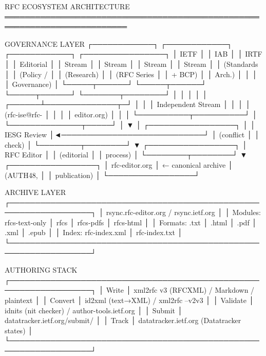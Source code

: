 \documentclass[11pt,letterpaper]{article}
\begin{document}
\begin{asciibox}
RFC ECOSYSTEM ARCHITECTURE
══════════════════════════════════════════════════════════════════════════

  GOVERNANCE LAYER
  ┌────────────┐   ┌────────────┐   ┌────────────┐   ┌────────────────┐
  │   IETF     │   │    IAB     │   │   IRTF     │   │   Editorial    │
  │  Stream    │   │  Stream    │   │  Stream    │   │    Stream      │
  │ (Standards │   │  (Policy / │   │ (Research) │   │  (RFC Series   │
  │  + BCP)    │   │  Arch.)    │   │            │   │   Governance)  │
  └─────┬──────┘   └─────┬──────┘   └─────┬──────┘   └───────┬────────┘
        │                │                │                   │
        │         ┌──────┴──────────────┬─┘                   │
        │         │  Independent Stream │                     │
        │         │  (rfc-ise@rfc-      │                     │
        │         │   editor.org)       │                     │
        │         └──────────┬──────────┘                     │
        └──────────────┬─────┘                                │
                       ▼                                      │
              ┌─────────────────┐                             │
              │   IESG Review   │◄────────────────────────────┘
              │  (conflict      │
              │   check)        │
              └────────┬────────┘
                       ▼
              ┌─────────────────┐
              │   RFC Editor    │
              │  (editorial     │
              │   process)      │
              └────────┬────────┘
                       ▼
              ┌─────────────────┐
              │  rfc-editor.org │  ← canonical archive
              │  (AUTH48,       │
              │   publication)  │
              └─────────────────┘

  ARCHIVE LAYER
  ┌──────────────────────────────────────────────────────────────────┐
  │  rsync.rfc-editor.org  /  rsync.ietf.org                        │
  │  Modules: rfcs-text-only  │  rfcs  │  rfcs-pdfs  │  rfcs-html  │
  │  Formats: .txt │ .html │ .pdf │ .xml │ .epub                    │
  │  Index:   rfc-index.xml  │  rfc-index.txt                       │
  └──────────────────────────────────────────────────────────────────┘

  AUTHORING STACK
  ┌──────────────────────────────────────────────────────────────────┐
  │  Write       │ xml2rfc v3 (RFCXML) / Markdown / plaintext       │
  │  Convert     │ id2xml (text→XML)  /  xml2rfc --v2v3             │
  │  Validate    │ idnits (nit checker) / author-tools.ietf.org     │
  │  Submit      │ datatracker.ietf.org/submit/                     │
  │  Track       │ datatracker.ietf.org  (Datatracker states)       │
  └──────────────────────────────────────────────────────────────────┘
\end{asciibox}
\end{document}
